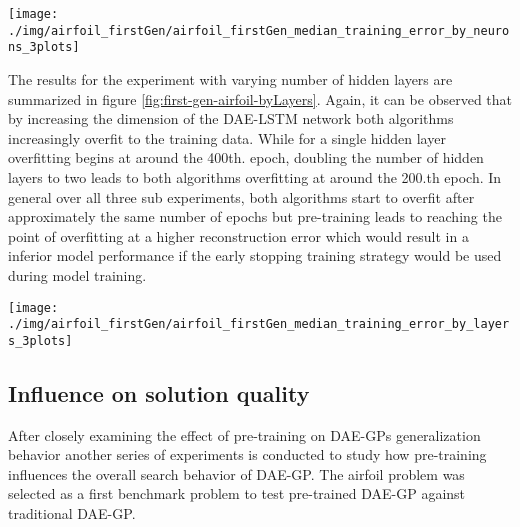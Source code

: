 \documentclass[
  11pt,
]{article}
\let\origfigure\figure
\let\endorigfigure\endfigure
\renewenvironment{figure}[1][2] {
    \expandafter\origfigure\expandafter[H]
} {
    \endorigfigure
}
\begin{document}
\begin{figure}[c]

{\centering \texttt{[image: ./img/airfoil\_firstGen/airfoil\_firstGen\_median\_training\_error\_by\_neurons\_3plots]} 

}

\caption{First Generation Median Reconstruction Error for variable number of hidden Neurons}\label{fig:first-gen-airfoil-byNeurons}
\end{figure}

The results for the experiment with varying number of hidden layers are summarized in figure \ref{fig:first-gen-airfoil-byLayers}. Again, it can be observed that by increasing the dimension of the DAE-LSTM network both algorithms increasingly overfit to the training data. While for a single hidden layer overfitting begins at around the 400th. epoch, doubling the number of hidden layers to two leads to both algorithms overfitting at around the 200.th epoch. In general over all three sub experiments, both algorithms start to overfit after approximately the same number of epochs but pre-training leads to reaching the point of overfitting at a higher reconstruction error which would result in a inferior model performance if the early stopping training strategy would be used during model training.

\begin{figure}[c]

{\centering \texttt{[image: ./img/airfoil\_firstGen/airfoil\_firstGen\_median\_training\_error\_by\_layers\_3plots]} 

}

\caption{First Generation Median Reconstruction Error for variable number of hidden Layers}\label{fig:first-gen-airfoil-byLayers}
\end{figure}

\hypertarget{influence-on-solution-quality}{%
\subsection{Influence on solution quality}\label{influence-on-solution-quality}}

After closely examining the effect of pre-training on DAE-GPs generalization behavior another series of experiments is conducted to study how pre-training influences the overall search behavior of DAE-GP. The airfoil problem was selected as a first benchmark problem to test pre-trained DAE-GP against traditional DAE-GP.
\end{document}
